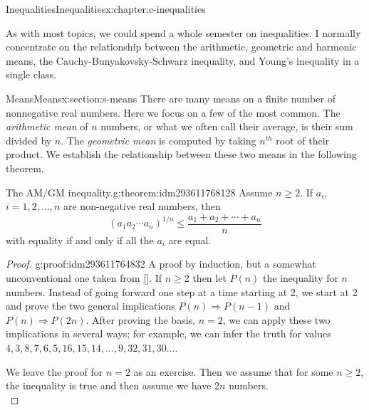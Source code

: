 \documentclass[twoside,10pt,]{book}
\newcommand{\xreffont}{\relax}
\numberwithin{equation}{section}
\begin{document}
\begin{chapterptx}{Inequalities}{}{Inequalities}{}{}{x:chapter:c-inequalities}
\begin{introduction}{}%
As with most topics, we could spend a whole semester on inequalities.  I normally concentrate on the relationship between the arithmetic, geometric and harmonic means, the Cauchy-Bunyakovsky-Schwarz inequality, and Young's inequality in a single class.%
\end{introduction}%
%
%
\typeout{************************************************}
\typeout{************************************************}
%
\begin{sectionptx}{Means}{}{Means}{}{}{x:section:s-means}
%
%
There are many means on a finite number of nonnegative real numbers.  Here we focus on a few of the most common.  The \emph{arithmetic mean} of \(n\) numbers, or what we often call their average, is their sum divided by \(n\).  The \emph{geometric mean} is computed by taking \(n^{th}\) root of their product.  We establish the relationship between these two means in the following theorem.%
\begin{theorem}{The AM\slash{}GM inequality.}{}{g:theorem:idm293611768128}%
%
Assume \(n \geq 2\).  If \(a_i\), \(i = 1, 2, \dots, n\) are non-negative real numbers, then%
\begin{equation*}
\left(a_1 a_2\cdots  a_n\right)^{1/n}\leq  \frac{a_1+a_2+\cdots +a_n}{n}
\end{equation*}
with equality if and only if all the \(a_i\) are equal.%
\end{theorem}
\begin{proof}{}{g:proof:idm293611764832}
A proof by induction, but a somewhat unconventional one taken from \hyperlink{x:biblio:biblio-aigner}{[{\xreffont 1}]}. If \(n \ge 2\) then let \(P(n)\) the inequality for \(n\) numbers.  Instead of going forward one step at a time starting at 2, we start at 2 and prove the two general implications  \(P(n)\Rightarrow P(n-1)\)  and \(P(n)\Rightarrow P(2n)\).  After proving the basis, \(n=2\), we can apply these two implications in several ways; for example, we can infer the truth for values \(4, 3, 8, 7, 6, 5, 16, 15, 14, \dots, 9, 32, 31, 30 \dots\).%
\par
We leave the proof for \(n=2\) as an exercise.  Then we assume that for some \(n \geq 2\), the inequality is true and then assume we have \(2n\) numbers.%
\begin{equation*}

\end{equation*}
\end{proof}
\end{sectionptx}
\end{chapterptx}
\end{document}
